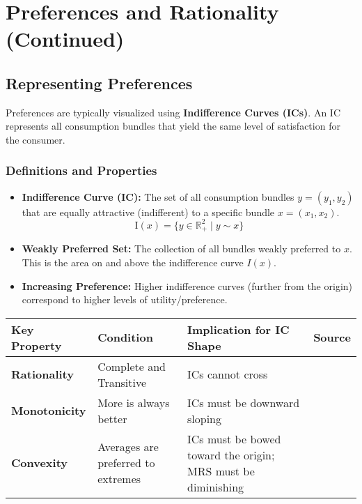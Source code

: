 \documentclass{article}
\begin{document}
\hrulefill

\section{Preferences and Rationality (Continued)}

\subsection{Representing Preferences}

Preferences are typically visualized using \textbf{Indifference Curves (ICs)}. An IC represents all consumption bundles that yield the same level of satisfaction for the consumer.

\subsubsection*{Definitions and Properties}

\begin{itemize}
    \item \textbf{Indifference Curve (IC):} The set of all consumption bundles $y = (y_1, y_2)$ that are equally attractive (indifferent) to a specific bundle $x = (x_1, x_2)$. \[\text{I}(x) = \{y \in \mathbb{R}^2_+ \mid y \sim x\}\]

    \item \textbf{Weakly Preferred Set:} The collection of all bundles weakly preferred to $x$. This is the area on and above the indifference curve $I(x)$.

    \item \textbf{Increasing Preference:} Higher indifference curves (further from the origin) correspond to higher levels of utility/preference.
\end{itemize}

\begin{center}
    \begin{tabular}{llll}
        \toprule
        Key Property & Condition & Implication for IC Shape & Source \\
        \midrule
        \textbf{Rationality} & Complete and Transitive & ICs cannot cross & \\
        \textbf{Monotonicity} & More is always better & ICs must be downward sloping & \\
        \textbf{Convexity} & Averages are preferred to extremes & ICs must be bowed toward the origin; MRS must be diminishing & \\
        \bottomrule
    \end{tabular}
\end{center}
\end{document}
